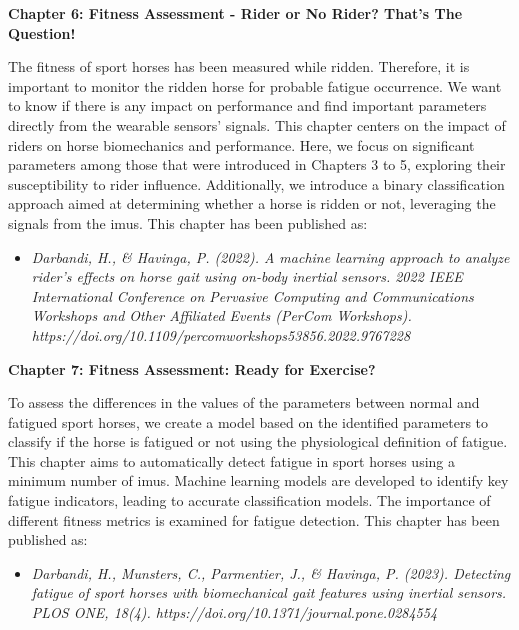 \vspace{.25cm}

\noindent\textbf{Chapter 6: Fitness Assessment - Rider or No Rider? That's The Question!}

\noindent The fitness of sport horses has been measured while ridden. Therefore, it is important to monitor the ridden horse for probable fatigue occurrence. We want to know if there is any impact on performance and find important parameters directly from the wearable sensors' signals. This chapter centers on the impact of riders on horse biomechanics and performance. Here, we focus on significant parameters among those that were introduced in Chapters 3 to 5, exploring their susceptibility to rider influence. Additionally, we introduce a binary classification approach aimed at determining whether a horse is ridden or not, leveraging the signals from the \gls{imu}s. This chapter has been published as:

\noindent\begin{itemize}
\item[]\begin{footnotesize}\textit{Darbandi, H., \& Havinga, P. (2022). A machine learning approach to analyze rider’s effects on horse gait using on-body inertial sensors. 2022 IEEE International Conference on Pervasive Computing and Communications Workshops and Other Affiliated Events (PerCom Workshops). https://doi.org/10.1109/percomworkshops53856.2022.9767228}\end{footnotesize}\end{itemize}

\noindent\textbf{Chapter 7: Fitness Assessment: Ready for Exercise?}

\noindent To assess the differences in the values of the parameters between normal and fatigued sport horses, we create a model based on the identified parameters to classify if the horse is fatigued or not using the physiological definition of fatigue. This chapter aims to automatically detect fatigue in sport horses using a minimum number of \gls{imu}s. Machine learning models are developed to identify key fatigue indicators, leading to accurate classification models. The importance of different fitness metrics is examined for fatigue detection. This chapter has been published as:

\begin{itemize}
\item[]\begin{footnotesize} \textit{
Darbandi, H., Munsters, C., Parmentier, J., \& Havinga, P. (2023). Detecting fatigue of sport horses with biomechanical gait features using inertial sensors. PLOS ONE, 18(4). https://doi.org/10.1371/journal.pone.0284554 }
\end{footnotesize} \end{itemize}

